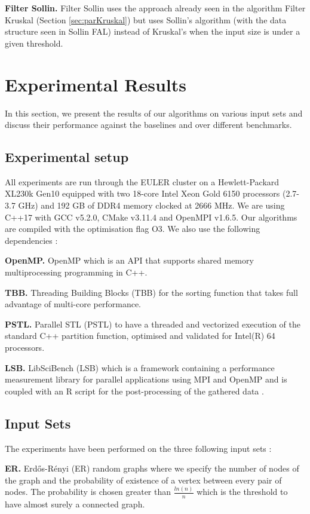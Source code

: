 \documentclass[letterpaper]{article}
\newcommand{\mypar}[1]{{\bf #1.}}
\begin{document}
\mypar{Filter Sollin} Filter Sollin uses the approach already seen in the algorithm Filter Kruskal (Section \ref{sec:parKruskal}) but uses Sollin's algorithm (with the data structure seen in Sollin FAL) instead of Kruskal's when the input size is under a given threshold.


\section{Experimental Results}\label{sec:exp}

In this section, we present the results of our algorithms on various input sets and discuss their performance against the baselines and over different benchmarks.

\subsection{Experimental setup} \label{sec:setup}

All experiments are run through the EULER cluster on a Hewlett-Packard XL230k Gen10 equipped with two 18-core Intel Xeon Gold 6150 processors (2.7-3.7 GHz) and 192 GB of DDR4 memory clocked at 2666 MHz. We are using C++17 with GCC v5.2.0, CMake v3.11.4 and OpenMPI v1.6.5. Our algorithms are compiled with the optimisation flag O3. We also use the following dependencies :

\mypar{OpenMP} OpenMP which is an API that supports shared memory multiprocessing programming in C++.

\mypar{TBB} Threading Building Blocks (TBB) for the sorting function that takes full advantage of multi-core performance.

\mypar{PSTL} Parallel STL (PSTL) to have a threaded and vectorized execution of the standard C++ partition function, optimised and validated for Intel(R) 64 processors.

\mypar{LSB} LibSciBench (LSB) which is a framework containing a performance measurement library for parallel applications using MPI and OpenMP and is coupled with an R script for the post-processing of the gathered data \cite{benchmarking} \cite{measuring}. 


\subsection{Input Sets}
The experiments have been performed on the three following input sets :

\mypar{ER} Erd\H{o}s-R\'{e}nyi (ER) random graphs where we specify the number of nodes of the graph and the probability of existence of a vertex between every pair of nodes. The probability is chosen greater than $\frac{ln(n)}{n}$ which is the threshold to have almost surely a connected graph.
\end{document}
